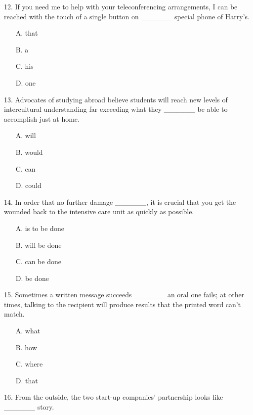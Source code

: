 \documentclass[UTF8,11pt]{ctexart}
\begin{document}
12. If you need me to help with your teleconferencing arrangements, I can be reached with the touch of a single button on \_\_\_\_\_\_ special phone of Harry’s.


\begin{itemize}[leftmargin=2em,itemsep=.2em,topsep=.4em]\item[A.] that
\item[B.] a
\item[C.] his
\item[D.] one
\end{itemize}

13. Advocates of studying abroad believe students will reach new levels of intercultural understanding far exceeding what they \_\_\_\_\_\_ be able to accomplish just at home.


\begin{itemize}[leftmargin=2em,itemsep=.2em,topsep=.4em]\item[A.] will
\item[B.] would
\item[C.] can
\item[D.] could
\end{itemize}

14. In order that no further damage \_\_\_\_\_\_, it is crucial that you get the wounded back to the intensive care unit as quickly as possible.


\begin{itemize}[leftmargin=2em,itemsep=.2em,topsep=.4em]\item[A.] is to be done
\item[B.] will be done
\item[C.] can be done
\item[D.] be done
\end{itemize}

15. Sometimes a written message succeeds \_\_\_\_\_\_ an oral one fails; at other times, talking to the recipient will produce results that the printed word can’t match.


\begin{itemize}[leftmargin=2em,itemsep=.2em,topsep=.4em]\item[A.] what
\item[B.] how
\item[C.] where
\item[D.] that
\end{itemize}

16. From the outside, the two start-up companies’ partnership looks like \_\_\_\_\_\_ story.
\end{document}

